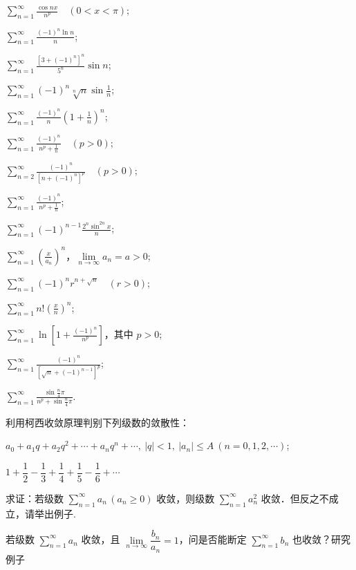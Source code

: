 \begin{xiti}
\begin{ziti}
\item $\displaystyle\sum_{n=1}^{\infty}\frac{\cos nx}{n^{p}}\quad(0<x<\pi)$;
\item $\displaystyle\sum_{n=1}^{\infty}\frac{(-1)^{n}\ln n}{n}$;
\item $\displaystyle\sum_{n=1}^{\infty}\frac{[3+(-1)^{n}]^{n}}{5^{n}}\sin n$;
\item $\displaystyle\sum_{n=1}^{\infty}(-1)^{n}\sqrt[n]{n}\sin\frac{1}{n}$;
\item $\displaystyle\sum_{n=1}^{\infty}\frac{(-1)^{n}}{n}\left(1+\frac{1}{n}\right)^{n}$;
\item $\displaystyle\sum_{n=1}^{\infty}\frac{(-1)^{n}}{n^{p}+\frac{1}{n}}\quad(p>0)$;
\item $\displaystyle\sum_{n=2}^{\infty}\frac{(-1)^{n}}{[n+(-1)^{n}]^{p}}\quad(p>0)$;
\item $\displaystyle\sum_{n=1}^{\infty}\frac{(-1)^{n}}{n^{p}+\frac{1}{n}}$;
\item $\displaystyle\sum_{n=1}^{\infty}(-1)^{n-1}\frac{2^{n}\sin^{2n}x}{n}$;
\item $\displaystyle\sum_{n=1}^{\infty}\left(\frac{x}{a_{n}}\right)^{n}$，$\lim\limits_{n\to\infty}a_n=a>0$;
\item $\displaystyle\sum_{n=1}^{\infty}(-1)^{n}r^{n+\sqrt{n}}\quad(r>0)$;
\item $\displaystyle\sum_{n=1}^{\infty}n!\left(\frac{x}{n}\right)^{n}$;
\item $\displaystyle\sum_{n=1}^{\infty}\ln\left[1+\frac{(-1)^n}{n^p}\right]$，其中 $p>0$;
\item $\displaystyle\sum_{n=1}^{\infty}\frac{(-1)^{n}}{[\sqrt{n}+(-1)^{n-1}]^{p}}$;
\item $\displaystyle\sum_{n=1}^{\infty}\frac{\sin\frac{n}{4}\pi}{n^{p}+\sin\frac{n}{4}\pi}$.
\end{ziti}
\item 利用柯西收敛原理判别下列级数的敛散性：
\begin{ziti}
\item $a_{0}+a_{1}q+a_{2}q^{2}+\cdots+a_{n}q^{n}+\cdots,\ |q|<1,\ |a_{n}|\leqslant A\ (n=0,1,2,\cdots)$;
\item $1+\dfrac{1}{2}-\dfrac{1}{3}+\dfrac{1}{4}+\dfrac{1}{5}-\dfrac{1}{6}+\cdots$
\end{ziti}
\item 求证：若级数 $\displaystyle\sum_{n=1}^{\infty}a_{n}\,(a_{n}\geqslant0)$ 收敛，则级数 $\sum_{n=1}^{\infty}a_{n}^{2}$ 收敛．但反之不成立，请举出例子.
\item 若级数 $\displaystyle\sum_{n=1}^{\infty}a_{n}$ 收敛，且 $\lim\limits_{n\to\infty}\dfrac{b_{n}}{a_{n}}=1$，问是否能断定 $\sum_{n=1}^{\infty}b_{n}$ 也收敛？研究例子

\end{xiti}
